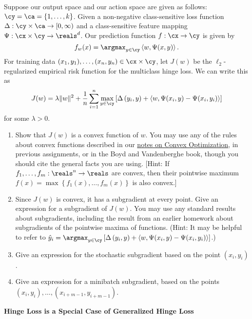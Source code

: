 \documentclass{article}
\newcommand{\nyuparagraph}[1]{\vspace{0.3cm}\textcolor{nyupurple}{\bf \large #1}\\}
\theoremstyle{plain}
\theoremstyle{definition}
\begin{document}
Suppose our output space and our action space are given as follows:
$\cy=\ca=\left\{ 1,\ldots,k\right\} $. Given a non-negative class-sensitive
loss function $\Delta:\cy\times\ca\to[0,\infty)$ and a class-sensitive
feature mapping $\Psi:\cx\times\cy\to\reals^{d}$. Our prediction
function $f:\cx\to\cy$ is given by
\[
f_{w}(x)=\argmax_{y\in\cy}\left\langle w,\Psi(x,y)\right\rangle .
\]
For training data $(x_{1},y_{1}),\ldots,(x_{n},y_{n})\in\cx\times\cy$,
let $J(w)$ be the $\ell_{2}$-regularized empirical risk function
for the multiclass hinge loss. We can write this as
\[
J(w)=\lambda\|w\|^{2}+\frac{1}{n}\sum_{i=1}^{n}\max_{y\in\cy}\left[\Delta\left(y_{i},y\right)+\left\langle w,\Psi(x_{i},y)-\Psi(x_{i},y_{i})\right\rangle \right]
\]
for some $\lambda>0$.
\begin{enumerate}
  \setcounter{enumi}{\value{saveenum}}
\item Show that $J(w)$ is a convex function of $w$. You
may use any of the rules about convex functions described in our \href{https://davidrosenberg.github.io/mlcourse/Notes/convex-optimization.pdf}{notes on Convex Optimization},
in previous assignments, or in the Boyd and Vandenberghe book, though
you should cite the general facts you are using. {[}Hint: If $f_{1},\ldots,f_{m}:\reals^{n}\to\reals$
are convex, then their pointwise maximum $f(x)=\max\left\{ f_{1}(x),\ldots,f_{m}(x)\right\} $
is also convex.{]}


\item Since $J(w)$ is convex, it has a subgradient at every point. Give
an expression for a subgradient of $J(w)$. You may use any standard
results about subgradients, including the result from an earlier homework
about subgradients of the pointwise maxima of functions. (Hint: It
may be helpful to refer to $\hat{y}_{i}=\argmax_{y\in\cy}\left[\Delta\left(y_{i},y\right)+\left\langle w,\Psi(x_{i},y)-\Psi(x_{i},y_{i})\right\rangle \right]$.)


\item Give an expression for the stochastic subgradient based on the point
$(x_{i},y_{i})$.


\item Give an expression for a minibatch subgradient, based on the points
$(x_{i},y_{i}),\ldots,\left(x_{i+m-1},y_{i+m-1}\right)$.


\setcounter{saveenum}{\value{enumi}}
\end{enumerate}

\nyuparagraph{Hinge Loss is a Special Case of Generalized Hinge
Loss}
\end{document}
